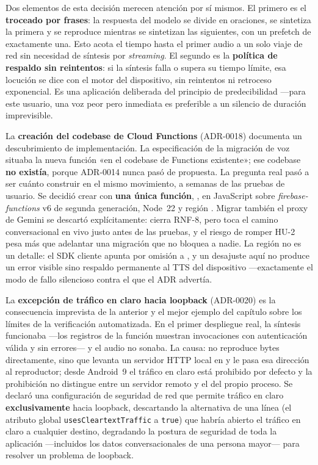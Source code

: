 Dos elementos de esta decisión merecen atención por sí mismos. El primero es el \textbf{troceado por
frases}: la respuesta del modelo se divide en oraciones, se sintetiza la primera y se reproduce mientras se
sintetizan las siguientes, con un prefetch de exactamente una. Esto acota el tiempo hasta el primer audio a
un solo viaje de red sin necesidad de síntesis por \emph{streaming}. El segundo es la \textbf{política de
respaldo sin reintentos}: si la síntesis falla o supera su tiempo límite, esa locución se dice con el motor
del dispositivo, sin reintentos ni retroceso exponencial. Es una aplicación deliberada del principio de
predecibilidad ---para este usuario, una voz peor pero inmediata es preferible a un silencio de duración
imprevisible.

La \textbf{creación del codebase de Cloud Functions} (ADR-0018) documenta un descubrimiento de
implementación. La especificación de la migración de voz situaba la nueva función «en el codebase de
Functions existente»; ese codebase \textbf{no existía}, porque ADR-0014 nunca pasó de propuesta. La
pregunta real pasó a ser cuánto construir en el mismo movimiento, a semanas de las pruebas de usuario. Se
decidió crear  con \textbf{una única función}, , en JavaScript
sobre \emph{firebase-functions} v6 de segunda generación, Node~22 y región . Migrar
también el proxy de Gemini se descartó explícitamente: cierra RNF-8, pero toca el camino conversacional en
vivo justo antes de las pruebas, y el riesgo de romper HU-2 pesa más que adelantar una migración que no
bloquea a nadie. La región no es un detalle: el SDK cliente apunta por omisión a , y un
desajuste aquí no produce un error visible sino respaldo permanente al TTS del dispositivo ---exactamente
el modo de fallo silencioso contra el que el ADR advertía.

La \textbf{excepción de tráfico en claro hacia loopback} (ADR-0020) es la consecuencia imprevista de la
anterior y el mejor ejemplo del capítulo sobre los límites de la verificación automatizada. En el primer
despliegue real, la síntesis funcionaba ---los registros de la función muestran invocaciones con
autenticación válida y sin errores--- y el audio no sonaba. La causa:  no reproduce bytes
directamente, sino que levanta un servidor HTTP local en  y le pasa esa dirección al
reproductor; desde Android~9 el tráfico en claro está prohibido por defecto y la prohibición no distingue
entre un servidor remoto y el del propio proceso. Se declaró una configuración de seguridad de red que
permite tráfico en claro \textbf{exclusivamente} hacia loopback, descartando la alternativa de una línea
(el atributo global \texttt{usesCleartextTraffic} a \texttt{true}) que habría abierto el tráfico en claro a
cualquier destino,
degradando la postura de seguridad de toda la aplicación ---incluidos los datos conversacionales de una
persona mayor--- para resolver un problema de loopback.

